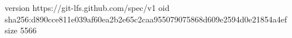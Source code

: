 version https://git-lfs.github.com/spec/v1
oid sha256:d890cce811e039af60ea2b2e65c2caa955079075868d609e2594d0e21854a4ef
size 5566
